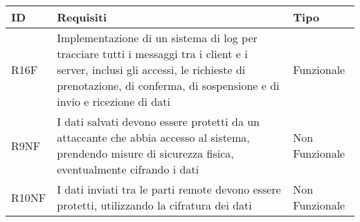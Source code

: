 \begin{tabular} {|P{3cm}|P{10cm}|P{3cm}|}
\hline
  \textbf{ID} & \textbf{Requisiti} & \textbf{Tipo}\\
\hline
  R16F & Implementazione di un sistema di log per tracciare tutti i messaggi tra i client e i server, inclusi gli accessi, le richieste di prenotazione, di conferma, di sospensione e di invio e ricezione di dati & Funzionale\\
\hline
  R9NF & I dati salvati devono essere protetti da un attaccante che abbia accesso al sistema, prendendo misure di sicurezza fisica, eventualmente cifrando i dati & Non Funzionale\\
\hline
  R10NF & I dati inviati tra le parti remote devono essere protetti, utilizzando la cifratura dei dati & Non Funzionale\\
\hline
\end{tabular}
